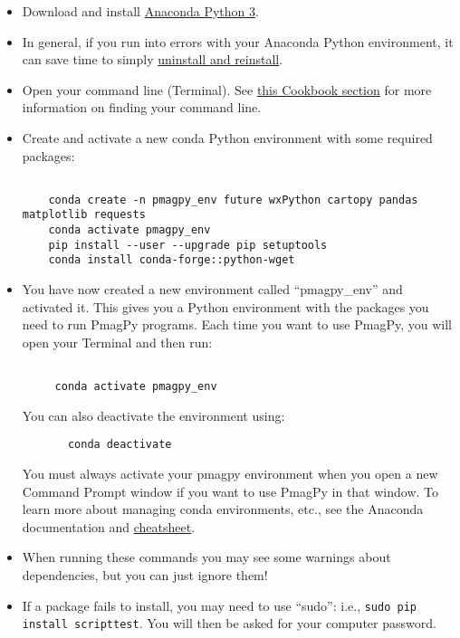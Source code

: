 \documentclass[11pt]{article}
\begin{document}
\begin{itemize}
\item Download and install \href{https://www.anaconda.com/download}{Anaconda Python 3}.
  \item In general, if you run into errors with your Anaconda Python environment, it can save time to simply \href{https://docs.anaconda.com/anaconda/install/uninstall/}{uninstall and reinstall}.
   \item Open your command line (Terminal).  See \href{https://earthref.org/PmagPy/cookbook/#command_line}{this Cookbook section} for more information on finding your command line.
   \item Create and activate a new conda Python environment with some required packages: \begin{verbatim}

    conda create -n pmagpy_env future wxPython cartopy pandas matplotlib requests
    conda activate pmagpy_env
    pip install --user --upgrade pip setuptools
    conda install conda-forge::python-wget
\end{verbatim}
   \item You have now created a new environment called ``pmagpy\_env'' and activated it.  This gives you a Python environment with the packages you need to run PmagPy programs.  Each time you want to use PmagPy, you will open your Terminal and then run:

\begin{verbatim}

     conda activate pmagpy_env
\end{verbatim}
     You can also deactivate the environment using:

     \begin{verbatim}
       conda deactivate
       \end{verbatim}

     You must always activate your pmagpy environment when you open a new Command Prompt window if you want to use PmagPy in that window.  To learn more about managing conda environments, etc., see the Anaconda documentation and \href{https://know.continuum.io/rs/387-XNW-688/images/conda-cheatsheet.pdf}{cheatsheet}.
   \item When running these commands you may see some warnings about dependencies, but you can just ignore them!

\item If a package fails to install, you may need to use ``sudo'': i.e., \texttt{sudo pip install scripttest}.  You will then be asked for your computer password.

  \end{itemize}
\end{document}
